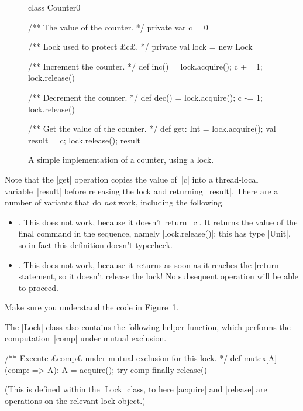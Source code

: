 \begin{figure}
\begin{scala}
class Counter0{
  /** The value of the counter. */
  private var c = 0

  /** Lock used to protect £c£. */
  private val lock = new Lock

  /** Increment the counter. */
  def inc() = { lock.acquire(); c += 1; lock.release() }

  /** Decrement the counter. */
  def dec() = { lock.acquire(); c -= 1; lock.release() }

  /** Get the value of the counter. */
  def get: Int = { lock.acquire(); val result = c; lock.release(); result }
}
\end{scala}
\caption{A simple implementation of a counter, using a lock.}
\label{fig:counter-lock0}
\end{figure}


Note that the |get| operation copies the value of~|c| into a thread-local
variable~|result| before releasing the lock and returning~|result|.  There are
a number of variants that do \emph{not} work, including the following.
\begin{itemize}
\item {}.  This
  does not work, because it doesn't return~|c|.  It returns the value of the
  final command in the sequence, namely |lock.release()|; this has type
  |Unit|, so in fact this definition doesn't typecheck.

\item {}.
  This does not work, because it returns as soon as it reaches the |return|
  statement, so it doesn't release the lock!  No subsequent operation will be
  able to proceed.
\end{itemize}

\begin{instruction}
Make sure you understand the code in Figure~\ref{fig:counter-lock0}.
\end{instruction}


The |Lock| class also contains the following helper function, which performs
the computation~|comp| under mutual exclusion.
\begin{scala}
  /** Execute £comp£ under mutual exclusion for this lock. */
  def mutex[A](comp: => A): A = {
    acquire(); try{ comp } finally{ release() }
  } 
\end{scala}
%
(This is defined within the |Lock| class, to here |acquire| and |release| are
operations on the relevant lock object.)

